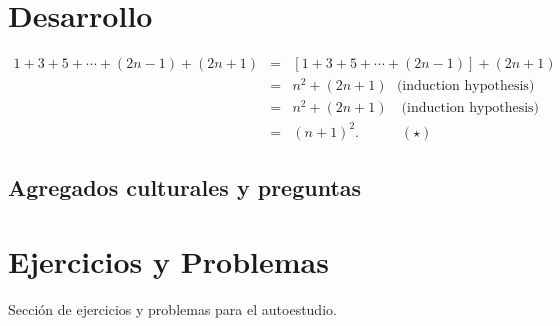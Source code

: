 \section{Desarrollo}


\begin{figure}[htb]
    \centering
    
\end{figure}

\begin{eqnarray*}
    1+3+5+\cdots+(2n-1) + (2n+1) & = & \left[1+3+5+\cdots+(2n-1)\right]+(2n+1) \\
    & = & n^2 + (2n+1)~~~\mbox{(induction hypothesis)} \\
    & = & n^2 + (2n+1)\quad \text{(induction hypothesis)} \\
    & = & (n+1)^2. \quad\qquad (\star)
\end{eqnarray*}






\subsection{Agregados culturales y preguntas}






\section{Ejercicios y Problemas}
Sección de ejercicios y problemas para el autoestudio.
